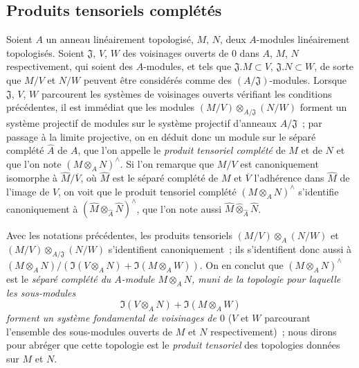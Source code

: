 \subsection{Produits tensoriels complétés}
\label{subsection:0.7.7-fr}

\begin{env}[7.7.1]
\label{0.7.7.1-fr}
Soient $A$ un anneau linéairement topologisé, $M$, $N$, deux $A$-modules
linéairement topologisés. Soient $\mathfrak J$, $V$, $W$ des voisinages
ouverts de $0$ dans $A$, $M$, $N$ respectivement, qui soient des
$A$-modules, et tels que $\mathfrak J.M\subset V$, $\mathfrak J.N\subset W$,
de sorte que $M/V$ et $N/W$ peuvent être considérés comme des
$(A/\mathfrak J)$-modules. Lorsque $\mathfrak J$, $V$, $W$ parcourent les
systèmes de voisinages ouverts vérifiant les conditions précédentes, il est
immédiat que les modules
$(M/V)\otimes_{A/\mathfrak J}(N/W)$ forment un système projectif de modules
sur le système projectif d'anneaux $A/\mathfrak J$~; par passage à la limite
projective, on en déduit donc un module sur le séparé complété $\widehat A$
de $A$, que l'on appelle le \emph{produit tensoriel complété} de $M$ et de
$N$ et que l'on note $(M\otimes_A N)^\wedge$. Si l'on remarque que $M/V$
est canoniquement isomorphe à $\widehat M/\overline V$, où $\widehat M$ est
le séparé complété de $M$ et $\overline V$ l'adhérence dans $\widehat M$ de
l'image de $V$, on voit que le produit tensoriel complété
$(M\otimes_A N)^\wedge$ s'identifie canoniquement à
$(\widehat M\otimes_{\widehat A}\widehat N)^\wedge$, que l'on note aussi
$\widehat M\widehat\otimes_{\widehat A}\widehat N$.
\end{env}

\begin{env}[7.7.2]
\label{0.7.7.2-fr}
\begin{sloppypar}
Avec les notations précédentes, les produits tensoriels
$(M/V)\otimes_A(N/W)$ et
$(M/V)\otimes_{A/\mathfrak J}(N/W)$ s'identifient canoniquement~; ils
s'identifient donc aussi à
$(M\otimes_A N)/(\Im(V\otimes_A N)+\Im(M\otimes_A W))$.
On en conclut que $(M\otimes_A N)^\wedge$ est le \emph{séparé complété du
$A$-module $M\otimes_A N$, muni de la topologie pour laquelle les
sous-modules}
\[
  \Im(V\otimes_A N)+\Im(M\otimes_A W)
\]
\emph{forment un système fondamental de voisinages de $0$} ($V$ et $W$
parcourant l'ensemble des sous-modules ouverts de $M$ et $N$
respectivement)~; nous dirons pour abréger que cette topologie est le
\emph{produit tensoriel} des topologies données sur $M$ et $N$.
\end{sloppypar}
\end{env}

